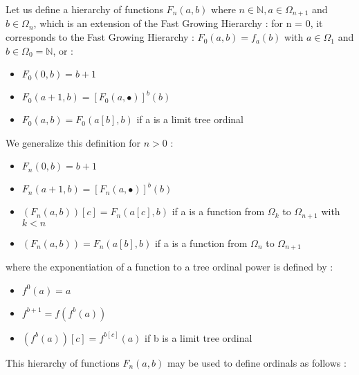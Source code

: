 \documentclass[10pt]{article}
\begin{document}
Let us define a hierarchy of functions \( F_n(a,b) \) where \( n \in \mathbb{N}, a \in \Omega_{n+1} \) and \( b \in \Omega_n \), which is an extension of the Fast Growing Hierarchy : for n = 0, it corresponds to the Fast Growing Hierarchy : \( F_0(a,b) = f_a(b) \) with \( a \in \Omega_1 \) and \( b \in \Omega_0 = \mathbb{N} \), or :

\begin{itemize}
     \setlength{\itemsep}{1pt}
     \setlength{\parskip}{0pt}
     \setlength{\parsep}{0pt}
\item \( F_0(0,b) = b+1 \)
\item \( F_0(a+1,b) = [F_0(a,\bullet)]^b(b) \)
\item \( F_0(a,b) = F_0(a[b],b) \) if a is a limit tree ordinal
\end{itemize}

We generalize this definition for \( n > 0 \) :

\begin{itemize}
     \setlength{\itemsep}{1pt}
     \setlength{\parskip}{0pt}
     \setlength{\parsep}{0pt}
\item \( F_n(0,b) = b+1 \)
\item \( F_n(a+1,b) = [F_n(a,\bullet)]^b(b) \)
\item \( (F_n(a,b))[c] = F_n(a[c],b) \) if a is a function from \( \Omega_k \) to \( \Omega_{n+1} \) with \( k < n \)
\item \( (F_n(a,b)) = F_n(a[b],b) \) if a is a function from \( \Omega_n \) to \( \Omega_{n+1} \)
\end{itemize}

where the exponentiation of a function to a tree ordinal power is defined by :

\begin{itemize}
     \setlength{\itemsep}{1pt}
     \setlength{\parskip}{0pt}
     \setlength{\parsep}{0pt}
\item \( f^0(a) = a \)
\item \( f^{b+1} = f(f^b(a)) \)
\item \( (f^b(a))[c] = f^{b[c]}(a) \) if b is a limit tree ordinal
\end{itemize}

This hierarchy of functions \( F_n(a,b) \) may be used to define ordinals as follows :
\end{document}
